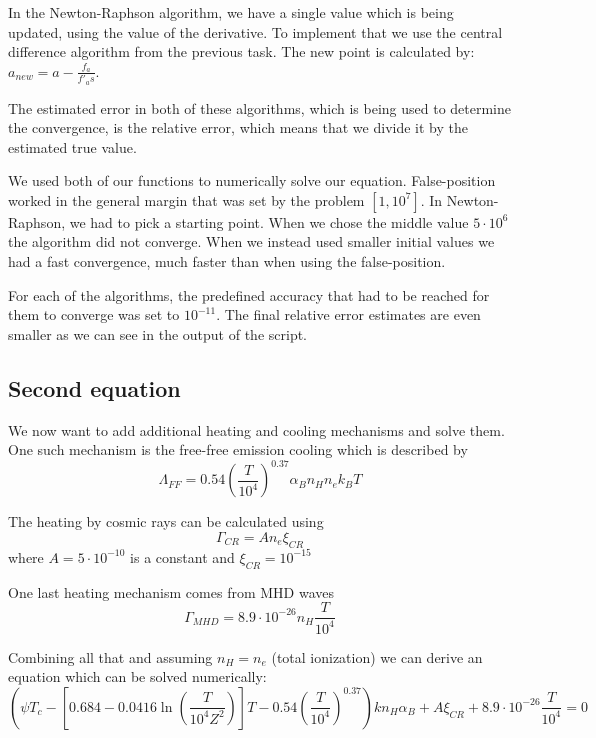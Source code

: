 \documentclass[a4paper,10pt]{article}
\begin{document}
In the Newton-Raphson algorithm, we have a single value which is being updated, using the value of the derivative. To implement that we use the central difference algorithm from the previous task. The new point is calculated by: $a_{new} = a -\frac{f_a}{f'_as} $. 

The estimated error in both of these algorithms, which is being used to determine the convergence, is the relative error, which means that we divide it by the estimated true value. 



We used both of our functions to numerically solve our equation. False-position worked in the general margin that was set by the problem $[1,10^7]$. In Newton-Raphson, we had to pick a starting point. When we chose the middle value $5\cdot 10^6$ the algorithm did not converge. When we instead used smaller initial values we had a fast convergence, much faster than when using the false-position. 

For each of the algorithms, the predefined accuracy that had to be reached for them to converge was set to $10^{-11}$. The final relative error estimates are even smaller as we can see in the output of the script. 




\subsection{Second equation}

We now want to add additional heating and cooling mechanisms and solve them. One such mechanism is the free-free emission cooling which is described by
\begin{equation}
  \Lambda_{FF}=0.54\left(\frac{T}{10^4}\right)^{0.37} \alpha_B n_H n_e k_B T
\end{equation}

The heating by cosmic rays can be calculated using
\begin{equation}
  \Gamma_{CR}=A n_e \xi_{CR}
\end{equation}
where $A=5\cdot 10^{-10}$ is a constant and $\xi_{CR}=10^{-15}$

One last heating mechanism comes from MHD waves 
\begin{equation}
  \Gamma_{MHD} = 8.9 \cdot 10^{-26} n_H \frac{T}{10^4}
\end{equation}

Combining all that and assuming $n_H=n_e$ (total ionization) we can derive an equation which can be solved numerically:
\begin{equation}
  (\psi T_c - \left[0.684-0.0416 \ln\left(\frac{T}{10^4 Z^2}\right)\right] T - 0.54\left(\frac{T}{10^4}\right)^{0.37}) k n_H \alpha_B + A \xi_{CR} + 8.9 \cdot 10^{-26} \frac{T}{10^4} = 0
\end{equation}
\end{document}
